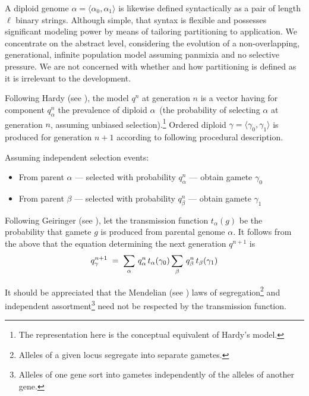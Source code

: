 A diploid genome $\alpha = \langle \alpha_0, \alpha_1 \rangle$ is
likewise defined syntactically as a pair of length $\ell$ binary
strings.  Although simple, that syntax is flexible and possesses
significant modeling power by means of tailoring partitioning to
application.  We concentrate on the abstract level, considering the
evolution of a non-overlapping, generational, infinite population
model assuming panmixia and no selective pressure. We are not concerned with 
whether and how partitioning is defined as it is irrelevant 
to the development.

Following Hardy (see \cite{Hardy1908}), the model $q^{n}$ at generation $n$
is a vector having for component $q_\alpha^n$ the prevalence of
diploid $\alpha\,$ (the probability of selecting $\alpha$ \nudge at
generation $n$, assuming unbiased selection).\setcounter{footnote}{2}\footnote{The 
representation here is the conceptual equivalent of Hardy's model.}
Ordered diploid $\gamma = \langle \gamma_0, \gamma_1 \rangle$ is
produced for generation $n+1$ according to following procedural
description.

  Assuming independent selection events:
\begin{itemize}
\item From parent $\alpha$ --- selected with probability
  $q_\alpha^n$ --- obtain gamete $\gamma_0$
\item From parent $\beta$ --- selected with probability $q_\beta^n$
  --- obtain gamete $\gamma_1$
\end{itemize}
Following Geiringer (see \cite{Geiringer1944}), let the transmission
function $t_\alpha(g)$ be the probability that gamete $g$ is produced
from parental genome $\alpha$.  It follows from the above that the
equation determining the next generation $q^{n+1}$ is
\begin{equation}
\label{model0}
q_\gamma^{n+1} \; = \;
\sum_{\alpha} \, q_\alpha^n \, t_\alpha(\gamma_0) 
\sum_{\beta} \,q_\beta^n \, t_\beta(\gamma_1)\\[-.05in]
\end{equation}

It should be appreciated that the Mendelian (see \cite{Mendel1866}) laws of
segregation\footnote{Alleles of a given locus segregate into separate
  gametes.} and independent assortment\footnote{Alleles of one gene
  sort into gametes independently of the alleles of another gene.}
need not be respected by the transmission function.


